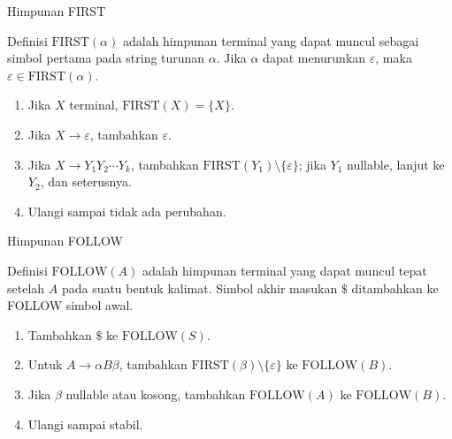 \documentclass[aspectratio=169,10pt,t]{beamer}
\begin{document}
\begin{frame}{Himpunan FIRST}
  \begin{block}{Definisi}
    \small
    \(\text{FIRST}(\alpha)\) adalah himpunan terminal yang dapat muncul
    sebagai simbol pertama pada string turunan \(\alpha\). Jika
    \(\alpha\) dapat menurunkan \(\varepsilon\), maka
    \(\varepsilon \in \text{FIRST}(\alpha)\).
  \end{block}

  \begin{enumerate}
    \setlength{\itemsep}{1pt}
    \item Jika \(X\) terminal, \(\text{FIRST}(X)=\{X\}\).
    \item Jika \(X \to \varepsilon\), tambahkan \(\varepsilon\).
    \item Jika \(X \to Y_1Y_2\cdots Y_k\), tambahkan
          \(\text{FIRST}(Y_1)\setminus\{\varepsilon\}\); jika \(Y_1\)
          nullable, lanjut ke \(Y_2\), dan seterusnya.
    \item Ulangi sampai tidak ada perubahan.
  \end{enumerate}
\end{frame}

\begin{frame}{Himpunan FOLLOW}
  \begin{block}{Definisi}
    \small
    \(\text{FOLLOW}(A)\) adalah himpunan terminal yang dapat muncul
    tepat setelah \(A\) pada suatu bentuk kalimat. Simbol akhir
    masukan \(\$\) ditambahkan ke FOLLOW simbol awal.
  \end{block}

  \begin{enumerate}
    \setlength{\itemsep}{1pt}
    \item Tambahkan \(\$\) ke \(\text{FOLLOW}(S)\).
    \item Untuk \(A \to \alpha B\beta\), tambahkan
          \(\text{FIRST}(\beta)\setminus\{\varepsilon\}\) ke
          \(\text{FOLLOW}(B)\).
    \item Jika \(\beta\) nullable atau kosong, tambahkan
          \(\text{FOLLOW}(A)\) ke \(\text{FOLLOW}(B)\).
    \item Ulangi sampai stabil.
  \end{enumerate}
\end{frame}
\end{document}
